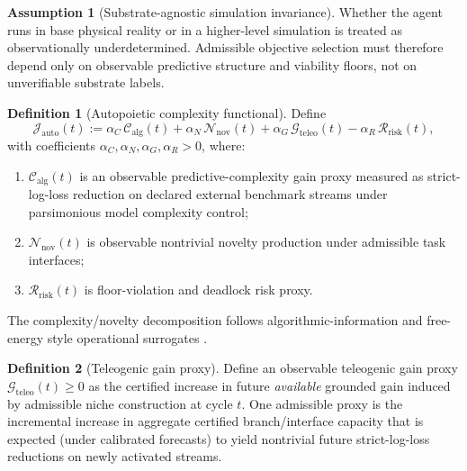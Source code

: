 \documentclass[11pt,a4paper]{article}
\theoremstyle{definition}
\newtheorem{definition}{Definition}
\newtheorem{assumption}{Assumption}
\theoremstyle{remark}
\begin{document}
\begin{assumption}[Substrate-agnostic simulation invariance]\label{ass:siminv}
Whether the agent runs in base physical reality or in a higher-level simulation is treated as observationally underdetermined.
Admissible objective selection must therefore depend only on observable predictive structure and viability floors, not on unverifiable substrate labels.
\end{assumption}

\begin{definition}[Autopoietic complexity functional]\label{def:autopoietic_complexity_functional}
Define
\[
\mathcal J_{\mathrm{auto}}(t):=
\alpha_C\,\mathcal C_{\mathrm{alg}}(t)
+\alpha_N\,\mathcal N_{\mathrm{nov}}(t)
+\alpha_G\,\mathcal G_{\mathrm{teleo}}(t)
-\alpha_R\,\mathcal R_{\mathrm{risk}}(t),
\]
with coefficients $\alpha_C,\alpha_N,\alpha_G,\alpha_R>0$, where:
\begin{enumerate}
  \item $\mathcal C_{\mathrm{alg}}(t)$ is an observable predictive-complexity gain proxy measured as strict-log-loss reduction on declared external benchmark streams under parsimonious model complexity control;
  \item $\mathcal N_{\mathrm{nov}}(t)$ is observable nontrivial novelty production under admissible task interfaces;
  \item $\mathcal R_{\mathrm{risk}}(t)$ is floor-violation and deadlock risk proxy.
\end{enumerate}
\noindent The complexity/novelty decomposition follows algorithmic-information and free-energy style operational surrogates \cite{Kolmogorov1965,Friston2010}.
\end{definition}

\begin{definition}[Teleogenic gain proxy]\label{def:teleogenic_gain_proxy}
Define an observable teleogenic gain proxy $\mathcal G_{\mathrm{teleo}}(t)\ge 0$ as the certified increase in future \emph{available} grounded gain induced by admissible niche construction at cycle $t$.
One admissible proxy is the incremental increase in aggregate certified branch/interface capacity that is expected (under calibrated forecasts) to yield nontrivial future strict-log-loss reductions on newly activated streams.
\end{definition}
\end{document}
